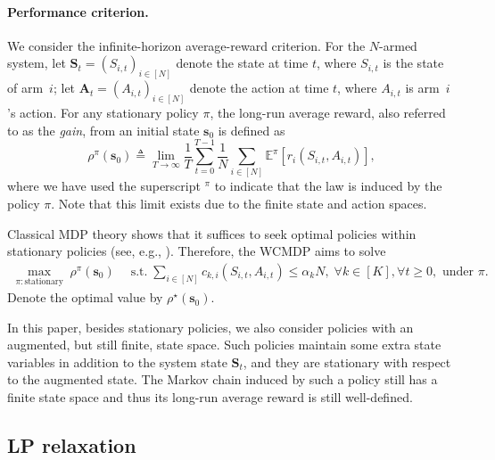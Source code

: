 \documentclass[mnsc,nonblindrev]{informs3}
\newcommand{\bms}{\bm{s}}
\begin{document}
\paragraph{Performance criterion.}
We consider the infinite-horizon average-reward criterion.
For the $N$-armed system, let \(\bm{S}_t = (S_{i,t})_{i\in[N]}\) denote the state at time $t$, where $S_{i,t}$ is the state of arm~$i$; let \(\bm{A}_t = (A_{i,t})_{i\in[N]}\) denote the action at time $t$, where $A_{i,t}$ is arm~$i$'s action.
For any stationary policy $\pi$, the long-run average reward, also referred to as the \emph{gain}, from an initial state $\bms_0$ is defined as
\[
\rho^\pi(\bms_0) \triangleq \lim_{T \to \infty} \frac{1}{T} \sum_{t=0}^{T-1} \frac{1}{N} \sum_{i \in [N]} \mathbb{E}^{\pi} \left[ r_i(S_{i,t}, A_{i,t}) \right],
\]
where we have used the superscript $^\pi$ to indicate that the law is induced by the policy $\pi$.
Note that this limit exists due to the finite state and action spaces.


Classical MDP theory shows that it suffices to seek optimal policies within stationary policies (see, e.g., \citealt[Theorem 9.1.8]{puterman2014markov}).
Therefore, the WCMDP aims to solve
\vspace{-0.05cm}\begin{align}
\label{eq:opt_problem}
\max_{\pi\colon \text{stationary}} \;\rho^\pi(\bms_0) \quad\; \text{s.t.} \;\sum\nolimits_{i \in [N]} c_{k,i}(S_{i,t}, A_{i,t}) \leq \alpha_{k} N, \;\forall k \in [K], \forall t \geq 0, \text{ under }\pi.
\end{align}
Denote the optimal value by $\rho^\star(\bms_0)$.


In this paper, besides stationary policies, we also consider policies with an augmented, but still finite, state space.
Such policies maintain some extra state variables in addition to the system state $\bm{S}_t$, and they are stationary with respect to the augmented state. The Markov chain induced by such a policy still has a finite state space and thus its long-run average reward is still well-defined.





\subsection{LP relaxation}\label{subsec:lp-relax}
\end{document}
